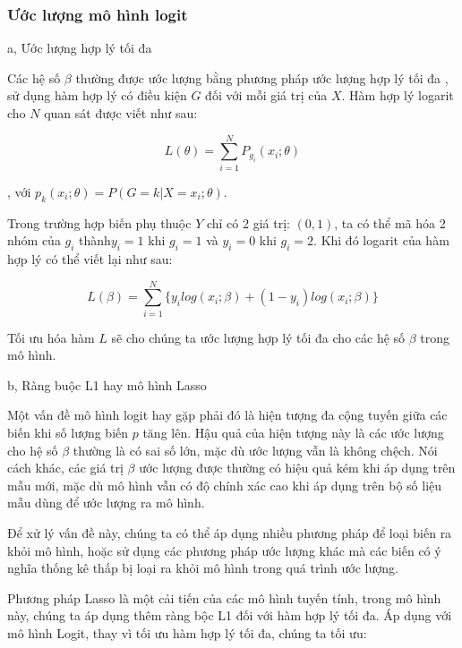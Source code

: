 \subsubsection{Ước lượng mô hình logit}
a, Ước lượng hợp lý tối đa

\vspace{5mm}


Các hệ số $\beta$ thường được ước lượng bằng phương pháp ước lượng hợp lý tối đa \parencite{hosmer2013applied}, sử dụng hàm hợp lý có điều kiện $G$ đối với mỗi giá trị của $X$. Hàm hợp lý logarit cho $N$ quan sát được viết như sau:

{\large

$$
L(\theta) = \sum_{i = 1}^N P_{g_i} (x_i; \theta)
$$
}
, với $p_k(x_i;\theta) = P(G = k|X = x_i; \theta)$.

Trong trường hợp biến phụ thuộc $Y$ chỉ có 2 giá trị: $(0, 1)$, ta có thể mã hóa 2 nhóm của $g_i$ thành$y_i = 1$ khi $g_i = 1$ và $y_i = 0$ khi $g_i = 2$. Khi đó logarit của hàm hợp lý có thể viết lại như  sau: 

{\large
$$
L(\beta) = \sum_{i = 1}^N \{  y_i log (x_i ; \beta) + (1- y_i)log (x_i; \beta) \}
$$
}

Tối ưu hóa hàm $L$ sẽ cho chúng ta ước lượng hợp lý tối đa cho các hệ số $\beta$ trong mô hình.

b, Ràng buộc L1 hay mô hình Lasso

\vspace{5mm}

Một vấn đề mô hình logit hay gặp phải đó là hiện tượng đa cộng tuyến giữa các biến khi số lượng biến $p$ tăng lên. Hậu quả của hiện tượng này là các ước lượng cho hệ số $\beta$ thường là có sai số lớn, mặc dù ước lượng vẫn là không chệch. Nói cách khác, các giá trị $\beta$ ước lượng được thường có hiệu quả kém khi áp dụng trên mẫu mới, mặc dù mô hình vẫn có độ chính xác cao khi áp dụng trên bộ số liệu mẫu dùng để ước lượng ra mô hình. 

Để xử lý vấn đề này, chúng ta có thể áp dụng nhiều phương pháp để loại biến ra khỏi mô hình, hoặc sử dụng các phương pháp ước lượng khác mà các biến có ý nghĩa thống kê thấp bị loại ra khỏi mô hình trong quá trình ước lượng.

Phương pháp Lasso là một cải tiến của các mô hình tuyến tính, trong mô hình này, chúng ta áp dụng thêm ràng bộc L1 đối với hàm hợp lý tối đa. Áp dụng với mô hình Logit, thay vì tối ưu hàm hợp lý tối đa, chúng ta tối ưu:

